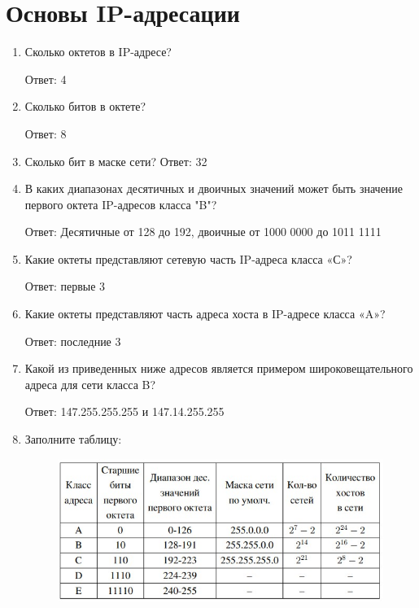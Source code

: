 \documentclass[bachelor, och, labwork]{shiza}
\begin{document}
\tableofcontents

\section{Основы IP-адресации}

\begin{enumerate}
    \item Сколько октетов в IP-адресе? 
    
    Ответ: 4
    \item Сколько битов в октете? 
    
    Ответ: 8
    \item Сколько бит в маске сети? 
    Ответ: 32
    \item В каких диапазонах десятичных и двоичных значений может быть значение 
    первого октета IP-адресов класса "B"?
        
    Ответ: Десятичные от 128 до 192, двоичные от 1000 0000 до 1011 1111
    \item Какие октеты представляют сетевую часть IP-адреса класса «С»? 
    
    Ответ: первые 3
    \item Какие октеты представляют часть адреса хоста в IP-адресе класса «A»? 
    
    Ответ: последние 3
    \item Какой из приведенных ниже адресов является примером широковещательного адреса для сети класса B?
    
    Ответ: 147.255.255.255 и 147.14.255.255
    \item Заполните таблицу:
    
    \begin{figure}[H]
        \centering      %
        \includegraphics[width=1\textwidth]{1}
        \label{fig:image1}
    \end{figure}

\end{enumerate}
\end{document}

